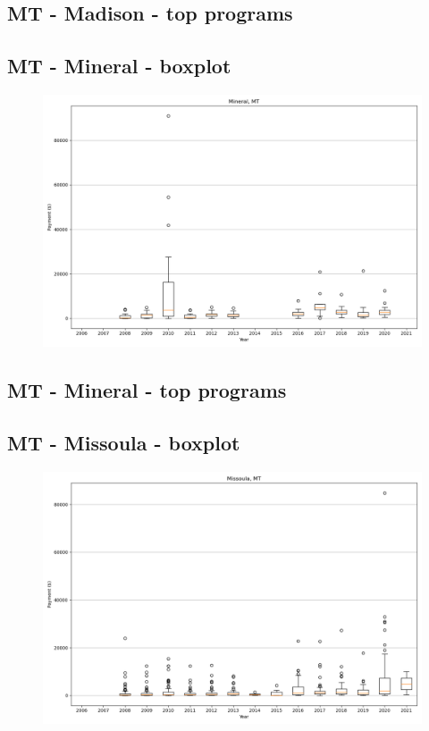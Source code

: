 \subsection*{MT - Madison - top programs}

\newpage
\subsection*{MT - Mineral - boxplot}
\begin{figure}[h]
\centering
\includegraphics[width=7in]{../output/boxplots/counties/Mineral-MT_boxplot.png}
\end{figure}


\subsection*{MT - Mineral - top programs}

\newpage
\subsection*{MT - Missoula - boxplot}
\begin{figure}[h]
\centering
\includegraphics[width=7in]{../output/boxplots/counties/Missoula-MT_boxplot.png}
\end{figure}


